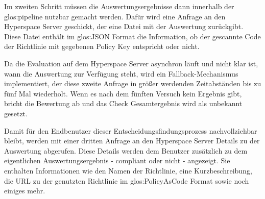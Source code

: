 \documentclass[../main.tex]{subfiles}
\begin{document}
Im zweiten Schritt müssen die Auswertungsergebnisse dann innerhalb der \gls{glos:pipeline} nutzbar gemacht werden.
Dafür wird eine Anfrage an den Hyperspace Server geschickt, der eine Datei mit der Auswertung zurückgibt.
Diese Datei enthält im \gls{glos:JSON} Format die Information, ob der gescannte Code der Richtlinie mit gegebenen Policy Key entspricht oder nicht.

Da die Evaluation auf dem Hyperspace Server asynchron läuft und nicht klar ist, wann die Auswertung zur Verfügung steht, wird ein Fallback-Mechanismus implementiert, der diese zweite Anfrage in größer werdenden Zeitabständen bis zu fünf Mal wiederholt.
Wenn es nach dem fünften Versuch kein Ergebnis gibt, bricht die Bewertung ab und das Check Gesamtergebnis wird als unbekannt gesetzt.

Damit für den Endbenutzer dieser Entscheidungsfindungsprozess nachvollziehbar bleibt, werden mit einer dritten Anfrage an den Hyperspace Server Details zu der Auswertung abgerufen.
Diese Details werden dem Benutzer zusätzlich zu dem eigentlichen Auswertungsergebnis - compliant oder nicht - angezeigt.
Sie enthalten Informationen wie den Namen der Richtlinie, eine Kurzbeschreibung, die URL zu der genutzten Richtlinie im \gls{glos:PolicyAsCode} Format sowie noch einiges mehr.
\end{document}
